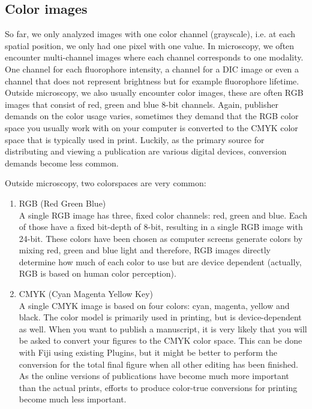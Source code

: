 \subsection{Color images}

So far, we only analyzed images with one color channel (grayscale), i.e. at each spatial position, we only had one pixel with one value. In microscopy, we often encounter multi-channel images where each channel corresponds to one modality. One channel for each fluorophore intensity, a channel for a DIC image or even a channel that does not represent brightness but for example fluorophore lifetime. Outside microscopy, we also usually encounter color images, these are often RGB images that consist of red, green and blue 8-bit channels. Again, publisher demands on the color usage varies, sometimes they demand that the RGB color space you usually work with on your computer is converted to the CMYK color space that is typically used in print. Luckily, as the primary source for distributing and viewing a publication are various digital devices, conversion demands become less common.

Outside microscopy, two colorspaces are very common:
\begin{enumerate}
	\item RGB (Red Green Blue)\\A single RGB image has three, fixed color channels: red, green and blue. Each of those have a fixed bit-depth of 8-bit, resulting in a single RGB image with 24-bit. These colors have been chosen as computer screens generate colors by mixing red, green and blue light and therefore, RGB images directly determine how much of each color to use but are device dependent (actually, RGB is based on human color perception).
	\item CMYK (Cyan Magenta Yellow Key)\\A single CMYK image is based on four colors: cyan, magenta, yellow and black. The color model is primarily used in printing, but is device-dependent as well. When you want to publish a manuscript, it is very likely that you will be asked to convert your figures to the CMYK color space. This can be done with Fiji using existing Plugins, but it might be better to perform the conversion for the total final figure when all other editing has been finished. As the online versions of publications have become much more important than the actual prints, efforts to produce color-true conversions for printing become much less important.
\end{enumerate}

